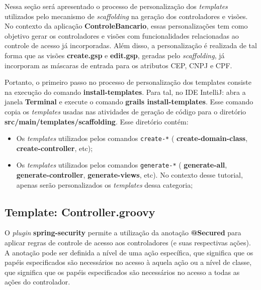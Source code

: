Nessa seção  será apresentado o  processo de personalização dos  {\it templates}
utilizados pelo  mecanismo de {\it  scaffolding} na geração dos  controladores e
visões. No  contexto da aplicação {\bf  ControleBancario}, essas personalizações
tem  como   objetivo  gerar  os  controladores  e   visões  com  funcionalidades
relacionadas ao controle de acesso já incorporadas. Além disso, a personalização
é  realizada de  tal forma  que  as visões  {\bf create.gsp}  e {\bf  edit.gsp},
geradas pelo  {\it scaffolding},  já incorporam as  máscaras de entrada  para os
atributos CEP, CNPJ e CPF.

\vspace{0.2cm}

Portanto, o primeiro passo no  processo de personalização dos templates consiste
na execução do comando {\bf  install-templates}. Para tal, no IDE IntelliJ: abra
a  janela {\bf  Terminal} e  execute o  comando {\bf  grails install-templates}.
Esse comando copia os {\it templates} usadas nas atividades de geração de código
para o diretório {\bf src/main/templates/scaffolding}.  Esse diretório contém:

\begin{itemize}

\vspace{0.2cm}

\item  Os  {\it templates}  utilizados  pelos  comandos \texttt{create-*}  ({\bf
  create-domain-class}, {\bf create-controller}, etc);

\vspace{0.2cm}

\item  Os {\it  templates} utilizados  pelos comandos  \texttt{generate-*} ({\bf
  generate-all},  {\bf  generate-controller},  {\bf generate-views},  etc).   No
  contexto desse tutorial, apenas  serão personalizados os {\it templates} dessa
  categoria; 

\end{itemize}

\newpage

\subsection{Template: Controller.groovy}

\vspace{0.5cm}

O  {\it plugin}  {\bf spring-security}  permite  a utilização  da anotação  {\bf
  @Secured} para aplicar regras de  controle de acesso aos controladores (e suas
respectivas  ações).   A  anotação  pode  ser  definida  a  nível  de  uma  ação
específica, que significa que os papéis especificados são necessários no acesso 
à aquela  ação ou a nível de  classe, que significa que  os papéis especificados
são     necessários      no     acesso      a     todas     as      ações     do
controlador.  

